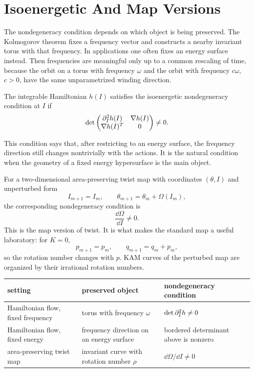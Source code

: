 \section{Isoenergetic And Map Versions}
\label{sec:kam-isoenergetic-map-versions}

The nondegeneracy condition depends on which object is being preserved.  The
Kolmogorov theorem fixes a frequency vector and constructs a nearby invariant
torus with that frequency.  In applications one often fixes an energy surface
instead.  Then frequencies are meaningful only up to a common rescaling of
time, because the orbit on a torus with frequency \(\omega\) and the orbit with
frequency \(c\omega\), \(c>0\), have the same unparametrized winding direction.

\begin{definition}
The integrable Hamiltonian \(h(I)\) satisfies the isoenergetic nondegeneracy
condition at \(I\) if
\[
        \det
        \begin{pmatrix}
        \partial_I^2h(I) & \nabla h(I)\\
        \nabla h(I)^T & 0
        \end{pmatrix}
        \ne 0 .
\]
\end{definition}

This condition says that, after restricting to an energy surface, the
frequency direction still changes nontrivially with the actions.  It is the
natural condition when the geometry of a fixed energy hypersurface is the main
object.

For a two-dimensional area-preserving twist map with coordinates \((\theta,I)\)
and unperturbed form
\[
        I_{m+1}=I_m,\qquad
        \theta_{m+1}=\theta_m+\Omega(I_m),
\]
the corresponding nondegeneracy condition is
\[
        \frac{\dd \Omega}{\dd I}\ne0 .
\]
This is the map version of twist.  It is what makes the standard map a useful
laboratory: for \(K=0\),
\[
        p_{m+1}=p_m,\qquad q_{m+1}=q_m+p_m ,
\]
so the rotation number changes with \(p\).  KAM curves of the perturbed map are
organized by their irrational rotation numbers.

\begin{center}
\begin{tabular}{p{} p{} p{}}
\hline
setting & preserved object & nondegeneracy condition\\
\hline
Hamiltonian flow, fixed frequency & torus with frequency \(\omega\) &
\(\det \partial_I^2h\ne0\)\\
Hamiltonian flow, fixed energy & frequency direction on an energy surface &
bordered determinant above is nonzero\\
area-preserving twist map & invariant curve with rotation number \(\rho\) &
\(\dd\Omega/\dd I\ne0\)\\
\hline
\end{tabular}
\end{center}

